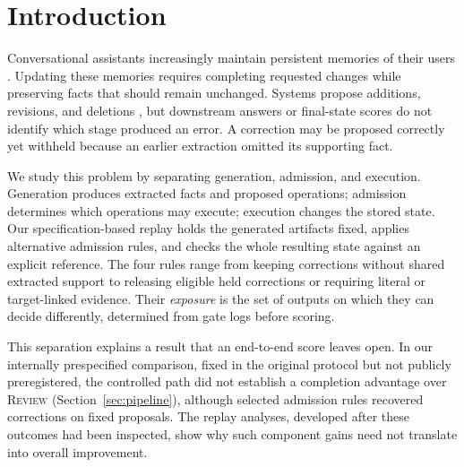 \documentclass[acmsmall,review]{acmart}
\newcommand{\review}{\textsc{Review}}
\begin{document}
\section{Introduction}\label{sec:intro}
Conversational assistants increasingly maintain persistent memories of their users \cite{cite10}. Updating these memories requires completing requested changes while preserving facts that should remain unchanged. Systems propose additions, revisions, and deletions \cite{cite4,cite6,cite21,cite39,cite40}, but downstream answers or final-state scores \cite{cite20,cite37} do not identify which stage produced an error. A correction may be proposed correctly yet withheld because an earlier extraction omitted its supporting fact.

We study this problem by separating generation, admission, and execution. Generation produces extracted facts and proposed operations; admission determines which operations may execute; execution changes the stored state. Our specification-based replay holds the generated artifacts fixed, applies alternative admission rules, and checks the whole resulting state against an explicit reference. The four rules range from keeping corrections without shared extracted support to releasing eligible held corrections or requiring literal or target-linked evidence. Their \emph{exposure} is the set of outputs on which they can decide differently, determined from gate logs before scoring.

This separation explains a result that an end-to-end score leaves open. In our internally prespecified comparison, fixed in the original protocol but not publicly preregistered, the controlled path did not establish a completion advantage over \review{} (Section~\ref{sec:pipeline}), although selected admission rules recovered corrections on fixed proposals. The replay analyses, developed after these outcomes had been inspected, show why such component gains need not translate into overall improvement.
\end{document}

